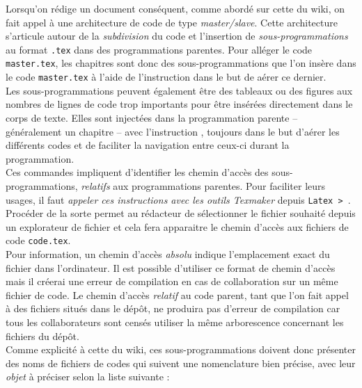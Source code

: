 \documentclass[a4paper, 11pt, twoside, fleqn]{memoir}
\begin{document}
Lorsqu'on rédige un document conséquent, comme abordé sur cette  du wiki, on fait appel à une architecture de code de type \emph{master/slave}. Cette architecture s'articule autour de la \emph{subdivision} du code et l'insertion de \emph{sous-programmations} au format \texttt{.tex} dans des programmations parentes. Pour alléger le code \texttt{master.tex}, les chapitres sont donc des sous-programmations que l'on insère dans le code \texttt{master.tex} à l'aide de l'instruction \texttt{} dans le but de aérer ce dernier.\\
Les sous-programmations peuvent également être des tableaux ou des figures aux nombres de lignes de code trop importants pour être insérées directement dans le corps de texte. Elles sont injectées dans la programmation parente -- généralement un chapitre -- avec l'instruction \texttt{} , toujours dans le but d'aérer les différents codes et de faciliter la navigation entre ceux-ci durant la programmation.\\

Ces commandes impliquent d'identifier les chemin d'accès des sous-programmations, \emph{relatifs} aux programmations parentes. Pour faciliter leurs usages, il faut \emph{appeler ces instructions avec les outils Texmaker} depuis \texttt{Latex > }. Procéder de la sorte permet au rédacteur de sélectionner le fichier souhaité depuis un explorateur de fichier et cela fera apparaitre le chemin d'accès aux fichiers de code \texttt{code.tex}.\\
Pour information, un chemin d'accès \emph{absolu} indique l'emplacement exact du fichier dans l'ordinateur. Il est possible d'utiliser ce format de chemin d'accès mais il créerai une erreur de compilation en cas de collaboration sur un même fichier de code. Le chemin d'accès \emph{relatif} au code parent, tant que l'on fait appel à des fichiers situés dans le dépôt, ne produira pas d'erreur de compilation car tous les collaborateurs sont censés utiliser la même arborescence concernant les fichiers du dépôt.\\

Comme explicité à cette  du wiki, ces sous-programmations doivent donc présenter des noms de fichiers de codes qui suivent une nomenclature bien précise, avec leur \emph{objet} à préciser selon la liste suivante :
\end{document}
